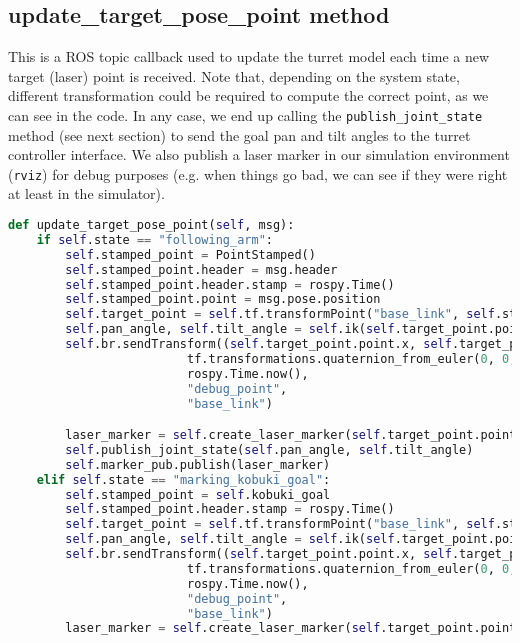 \subsection*{update\_target\_pose\_point method}
This is a ROS topic callback used to update the turret model each time a new target (laser) point is received. Note that, depending on the system state, different transformation could be required to compute the correct point, as we can see in the code. In any case, we end up calling the \texttt{publish\_joint\_state} method (see next section) to send the goal pan and tilt angles to the turret controller interface. We also publish a laser marker in our simulation environment (\texttt{rviz}) for debug purposes (e.g. when things go bad, we can see if they were right at least in the simulator).
\begin{lstlisting}[caption={Update Target Pose Point},label={lst:updatetargetpose},language=Python]
def update_target_pose_point(self, msg):
    if self.state == "following_arm":
        self.stamped_point = PointStamped()
        self.stamped_point.header = msg.header
        self.stamped_point.header.stamp = rospy.Time()
        self.stamped_point.point = msg.pose.position
        self.target_point = self.tf.transformPoint("base_link", self.stamped_point)
        self.pan_angle, self.tilt_angle = self.ik(self.target_point.point.x, self.target_point.point.y, self.target_point.point.z)
        self.br.sendTransform((self.target_point.point.x, self.target_point.point.y, self.target_point.point.z),
                         tf.transformations.quaternion_from_euler(0, 0, 0),
                         rospy.Time.now(),
                         "debug_point",
                         "base_link")

        laser_marker = self.create_laser_marker(self.target_point.point)
        self.publish_joint_state(self.pan_angle, self.tilt_angle)
        self.marker_pub.publish(laser_marker)
    elif self.state == "marking_kobuki_goal":
        self.stamped_point = self.kobuki_goal
        self.stamped_point.header.stamp = rospy.Time()
        self.target_point = self.tf.transformPoint("base_link", self.stamped_point)
        self.pan_angle, self.tilt_angle = self.ik(self.target_point.point.x, self.target_point.point.y, self.target_point.point.z)
        self.br.sendTransform((self.target_point.point.x, self.target_point.point.y, self.target_point.point.z),
                         tf.transformations.quaternion_from_euler(0, 0, 0),
                         rospy.Time.now(),
                         "debug_point",
                         "base_link")
        laser_marker = self.create_laser_marker(self.target_point.point)
        

\end{lstlisting}
